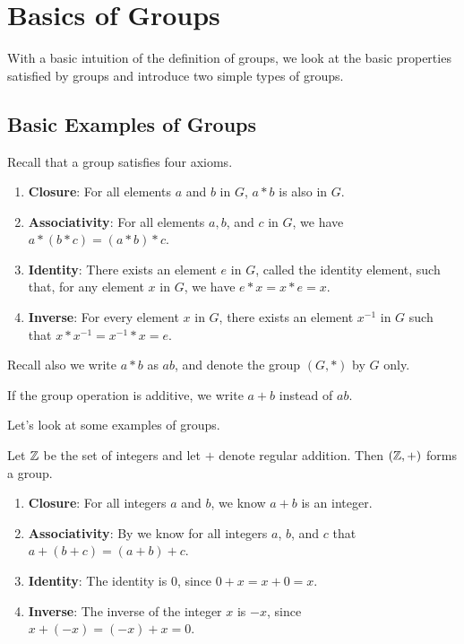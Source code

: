 \chapter{Basics of Groups}
With a basic intuition of the definition of groups, we look at the basic properties satisfied by groups and introduce two simple types of groups.

\section{Basic Examples of Groups}
Recall that a group satisfies four axioms.
\begin{enumerate}
    \item \textbf{Closure}: For all elements $a$ and $b$ in $G$, $a \ast b$ is also in $G$.
    \item \textbf{Associativity}: For all elements $a, b$, and $c$ in $G$, we have $a \ast (b \ast c) = (a \ast b) \ast c$.
    \item \textbf{Identity}: There exists an element $e$ in $G$, called the identity element, such that, for any element $x$ in $G$, we have $e \ast x = x \ast e = x$.
    \item \textbf{Inverse}: For every element $x$ in $G$, there exists an element $x^{-1}$ in $G$ such that $x \ast x^{-1} = x^{-1} \ast x = e$.
\end{enumerate}

Recall also we write $a \ast b$ as $ab$, and denote the group $(G, \ast)$ by $G$ only.
\begin{remark}
    If the group operation is additive, we write $a + b$ instead of $ab$.
\end{remark}

Let's look at some examples of groups.
\begin{example}
    Let $\mathbb{Z}$ be the set of integers and let $+$ denote regular addition. Then $(\mathbb{Z}, +)$ forms a group.
    \begin{enumerate}
        \item \textbf{Closure}: For all integers $a$ and $b$, we know $a + b$ is an integer.
        \item \textbf{Associativity}: By  we know for all integers $a$, $b$, and $c$ that $a + (b + c) = (a + b) + c$.
        \item \textbf{Identity}: The identity is 0, since $0 + x = x + 0 = x$.
        \item \textbf{Inverse}: The inverse of the integer $x$ is $-x$, since $x + (-x) = (-x) + x = 0$.
    \end{enumerate}
\end{example}

